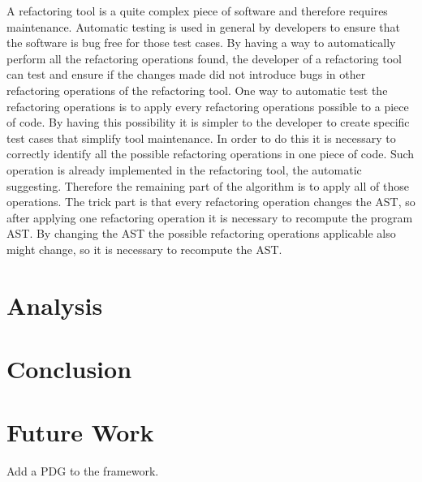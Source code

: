 A refactoring tool is a quite complex piece of software and therefore requires maintenance.
Automatic testing is used in general by developers to ensure that the software
is bug free for those test cases.
By having a way to automatically perform all the refactoring operations found,
the developer of a refactoring tool can test and ensure if the changes made did not introduce
bugs in other refactoring operations of the refactoring tool.
One way to automatic test the refactoring operations is to apply every refactoring
operations possible to a piece of code. By having this possibility it is simpler
to the developer to create specific test cases that simplify tool maintenance.
In order to do this it is necessary to correctly identify all the possible refactoring
operations in one piece of code. Such operation is already implemented in the refactoring
tool, the automatic suggesting.
Therefore the remaining part of the algorithm is to apply all of those operations.
The trick part is  that every refactoring operation changes the AST, so after
applying one refactoring operation it is necessary to recompute the program AST.
By changing the AST the possible refactoring operations applicable also might change,
so it is necessary to recompute the AST.

\section{Analysis}

\section{Conclusion}
\section{Future Work}
Add a PDG to the framework.
